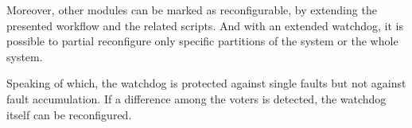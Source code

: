 Moreover, other modules can be marked as reconfigurable, by extending the presented workflow and the related scripts. And with an extended watchdog, it is possible to partial reconfigure only specific partitions of the system or the whole system. \bigskip

Speaking of which, the watchdog is protected against single faults but not against fault accumulation. If a difference among the voters is detected, the watchdog itself can be reconfigured.  



